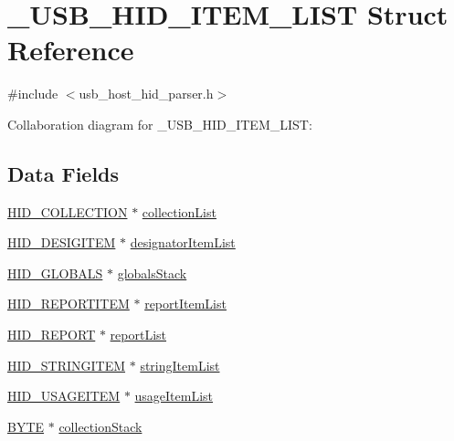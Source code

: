 \hypertarget{struct___u_s_b___h_i_d___i_t_e_m___l_i_s_t}{}\section{\+\_\+\+U\+S\+B\+\_\+\+H\+I\+D\+\_\+\+I\+T\+E\+M\+\_\+\+L\+I\+S\+T Struct Reference}
\label{struct___u_s_b___h_i_d___i_t_e_m___l_i_s_t}


{\ttfamily \#include $<$usb\+\_\+host\+\_\+hid\+\_\+parser.\+h$>$}



Collaboration diagram for \+\_\+\+U\+S\+B\+\_\+\+H\+I\+D\+\_\+\+I\+T\+E\+M\+\_\+\+L\+I\+S\+T\+:
\subsection*{Data Fields}
\begin{DoxyCompactItemize}
\item 
\hyperlink{usb__host__hid__parser_8h_ac21ab5234c119b1a46773f797c74c9fc}{H\+I\+D\+\_\+\+C\+O\+L\+L\+E\+C\+T\+I\+O\+N} $\ast$ \hyperlink{struct___u_s_b___h_i_d___i_t_e_m___l_i_s_t_a188d8e5c57732e3c9e552168daadd3b5}{collection\+List}
\item 
\hyperlink{usb__host__hid__parser_8h_a1c3f39775c2cb47dfee10504c80c03b6}{H\+I\+D\+\_\+\+D\+E\+S\+I\+G\+I\+T\+E\+M} $\ast$ \hyperlink{struct___u_s_b___h_i_d___i_t_e_m___l_i_s_t_ae8d392f0a4ac6f4ecc7598c3f10c949a}{designator\+Item\+List}
\item 
\hyperlink{usb__host__hid__parser_8h_a7c40331ec98442072d8952931f11998f}{H\+I\+D\+\_\+\+G\+L\+O\+B\+A\+L\+S} $\ast$ \hyperlink{struct___u_s_b___h_i_d___i_t_e_m___l_i_s_t_a1457f383bcfd06224ae93ac4127e3045}{globals\+Stack}
\item 
\hyperlink{usb__host__hid__parser_8h_a267c28997732d31ee333a401e139071f}{H\+I\+D\+\_\+\+R\+E\+P\+O\+R\+T\+I\+T\+E\+M} $\ast$ \hyperlink{struct___u_s_b___h_i_d___i_t_e_m___l_i_s_t_a2a6022b908e85ecb4f6b7d227950c663}{report\+Item\+List}
\item 
\hyperlink{usb__host__hid__parser_8h_a03143fa96dc8bc5124ff465483f34267}{H\+I\+D\+\_\+\+R\+E\+P\+O\+R\+T} $\ast$ \hyperlink{struct___u_s_b___h_i_d___i_t_e_m___l_i_s_t_a11cccc2cd432f7f02fb9cc6e7147f9a0}{report\+List}
\item 
\hyperlink{usb__host__hid__parser_8h_ac01e256ef0810fa8626c5f1b0d9ab46b}{H\+I\+D\+\_\+\+S\+T\+R\+I\+N\+G\+I\+T\+E\+M} $\ast$ \hyperlink{struct___u_s_b___h_i_d___i_t_e_m___l_i_s_t_a44feaff25d3dd75b38ad77bee10206d6}{string\+Item\+List}
\item 
\hyperlink{usb__host__hid__parser_8h_ac1beb24d420ed6a15afa184ce0c9969b}{H\+I\+D\+\_\+\+U\+S\+A\+G\+E\+I\+T\+E\+M} $\ast$ \hyperlink{struct___u_s_b___h_i_d___i_t_e_m___l_i_s_t_a0297cd59d5ef7d0cb92461c9212f3f16}{usage\+Item\+List}
\item 
\hyperlink{_generic_type_defs_8h_a4ae1dab0fb4b072a66584546209e7d58}{B\+Y\+T\+E} $\ast$ \hyperlink{struct___u_s_b___h_i_d___i_t_e_m___l_i_s_t_a23acf9a15a4802ff4efefdaf9c488315}{collection\+Stack}
\end{DoxyCompactItemize}


